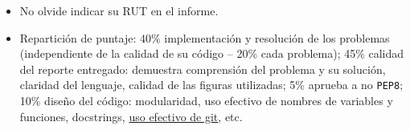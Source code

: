 \documentclass[letter, 11pt]{article}
\begin{document}
\begin{itemize}
  \item No olvide indicar su RUT en el informe.

  \item Repartición de puntaje: 40\% implementación y resolución de los
    problemas (independiente de la calidad de su código -- 20\% cada problema);
    45\% calidad del reporte entregado: demuestra comprensión del problema y su
    solución, claridad del lenguaje, calidad de las figuras utilizadas; 5\%
    aprueba a no \texttt{PEP8}; 10\% diseño del código: modularidad, uso
    efectivo de nombres de variables y funciones, docstrings, \underline{uso
    efectivo de git}, etc.

\end{itemize}


\end{document}
